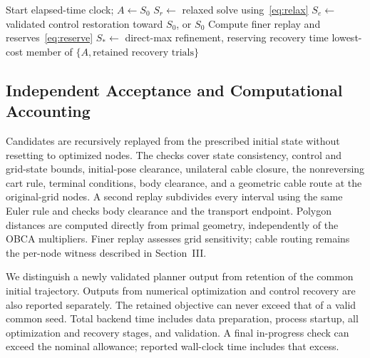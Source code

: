 \begin{algorithm}[!t]
\caption{Trajectory refinement with validated control recovery}
\label{alg:planner}
\DontPrintSemicolon\SetAlgoVlined
{}
Start elapsed-time clock; $A\gets S_0$\;
$S_r\gets$ relaxed solve using~\eqref{eq:relax}\;
$S_e\gets$ validated control restoration toward $S_0$, or $S_0$\;
Compute finer replay and reserves~\eqref{eq:reserve}\;
$S_*\gets$ direct-max refinement, reserving recovery time\;
\Return lowest-cost member of $\{A,\text{retained recovery trials}\}$\;
\end{algorithm}

\subsection{Independent Acceptance and Computational Accounting}
Candidates are recursively replayed from the prescribed initial state without resetting to optimized nodes. The checks cover state consistency, control and grid-state bounds, initial-pose clearance, unilateral cable closure, the nonreversing cart rule, terminal conditions, body clearance, and a geometric cable route at the original-grid nodes. A second replay subdivides every interval using the same Euler rule and checks body clearance and the transport endpoint. Polygon distances are computed directly from primal geometry, independently of the OBCA multipliers. Finer replay assesses grid sensitivity; cable routing remains the per-node witness described in Section~III.

We distinguish a newly validated planner output from retention of the common initial trajectory. Outputs from numerical optimization and control recovery are also reported separately. The retained objective can never exceed that of a valid common seed. Total backend time includes data preparation, process startup, all optimization and recovery stages, and validation. A final in-progress check can exceed the nominal allowance; reported wall-clock time includes that excess.

